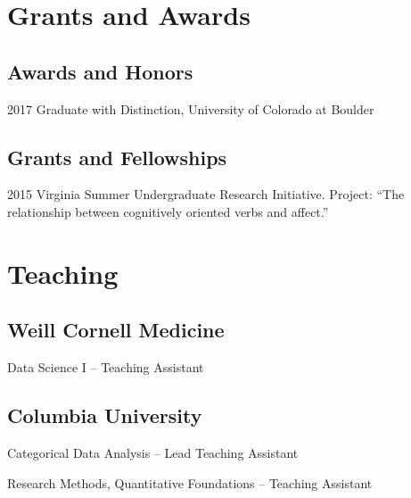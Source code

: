\documentclass[12pt,letterpaper]{report}
\newcommand{\listitemspace}{0.15em}
\renewenvironment{itemize}
{\begin{list}{}{\setlength{\leftmargin}{0em}
            \setlength{\parskip}{0em}
            \setlength{\itemsep}{\listitemspace}
            \setlength{\parsep}{\listitemspace}}}
    {\end{list}}
\begin{document}
    \section*{Grants and Awards}

    \subsection*{Awards and Honors}

    \begin{tablist}

        \item[2017] \tab Graduate with Distinction, University of Colorado at Boulder

    \end{tablist}

    \subsection*{Grants and Fellowships}

    \begin{tablist}

        \item[2015] \tab Virginia Summer Undergraduate Research Initiative. Project: \enquote{The relationship between cognitively oriented verbs and affect.}

    \end{tablist}

    \section*{Teaching}
    
    \subsection*{Weill Cornell Medicine}
    
    \begin{itemize}
    
    	\item Data Science I -- Teaching Assistant
    
    \end{itemize}

    \subsection*{Columbia University}
    
    \begin{itemize}
    	
    	\item Categorical Data Analysis -- Lead Teaching Assistant
    	\item Research Methods, Quantitative Foundations -- Teaching Assistant
    
    \end{itemize}
\end{document}
